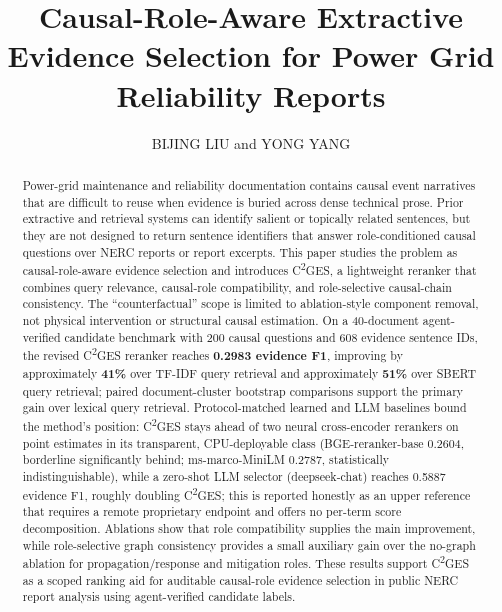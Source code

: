 \documentclass{ieeeaccess}
\begin{document}
\doi{}

\title{Causal-Role-Aware Extractive Evidence Selection for Power Grid Reliability Reports}
\author{\uppercase{Bijing Liu} and \uppercase{Yong Yang}}
\address[1]{NARI Group Corporation (State Grid Electric Power Research Institute), Nanjing 211106, Jiangsu Province, China}
\address[2]{Beijing Kedong Electric Power Control System Co., Ltd., Beijing 100080, China}

\begin{abstract}
Power-grid maintenance and reliability documentation contains causal event narratives that are difficult to reuse when evidence is buried across dense technical prose. Prior extractive and retrieval systems can identify salient or topically related sentences, but they are not designed to return sentence identifiers that answer role-conditioned causal questions over NERC reports or report excerpts. This paper studies the problem as causal-role-aware evidence selection and introduces C\textsuperscript{2}GES, a lightweight reranker that combines query relevance, causal-role compatibility, and role-selective causal-chain consistency. The ``counterfactual'' scope is limited to ablation-style component removal, not physical intervention or structural causal estimation. On a 40-document agent-verified candidate benchmark with 200 causal questions and 608 evidence sentence IDs, the revised C\textsuperscript{2}GES reranker reaches \textbf{0.2983 evidence F1}, improving by approximately \textbf{41\%} over TF-IDF query retrieval and approximately \textbf{51\%} over SBERT query retrieval; paired document-cluster bootstrap comparisons support the primary gain over lexical query retrieval. Protocol-matched learned and LLM baselines bound the method's position: C\textsuperscript{2}GES stays ahead of two neural cross-encoder rerankers on point estimates in its transparent, CPU-deployable class (BGE-reranker-base 0.2604, borderline significantly behind; ms-marco-MiniLM 0.2787, statistically indistinguishable), while a zero-shot LLM selector (deepseek-chat) reaches 0.5887 evidence F1, roughly doubling C\textsuperscript{2}GES; this is reported honestly as an upper reference that requires a remote proprietary endpoint and offers no per-term score decomposition. Ablations show that role compatibility supplies the main improvement, while role-selective graph consistency provides a small auxiliary gain over the no-graph ablation for propagation/response and mitigation roles. These results support C\textsuperscript{2}GES as a scoped ranking aid for auditable causal-role evidence selection in public NERC report analysis using agent-verified candidate labels.
\end{abstract}
\end{document}

